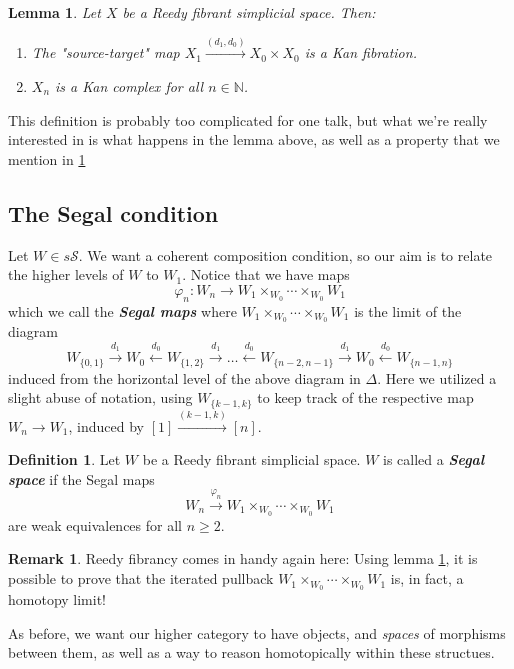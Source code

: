 \documentclass{article}
\newcommand{\textbi}[1]{\textbf{\textit{#1}}}
\newcommand{\bN}{\mathbb{N}}
\newcommand{\cS}{\mathcal{S}}
\newcommand{\sS}{s\cS}
\newtheorem{lem}[subsection]{Lemma}
\theoremstyle{definition}
\newtheorem{defin}[subsection]{Definition}
\newtheorem{rem}[subsection]{Remark}
\begin{document}
\begin{lem}\label{refib}
    Let $X$ be a Reedy fibrant simplicial space. Then:
    \begin{enumerate}
        \item The "source-target" map $X_1\xrightarrow{(d_1,d_0)}X_0\times X_0$ is a Kan fibration.
        \item $X_n$ is a Kan complex for all $n\in \bN$.
    \end{enumerate}
\end{lem}

This definition is probably too complicated for one talk, but what we're really interested in is what happens in the lemma above, as well as a property that we mention in \ref{reedy}

\subsection*{The Segal condition}

Let $W\in\sS$. We want a coherent composition condition, so our aim is to relate the higher levels of $W$ to $W_1$. 
Notice that we have maps
$$\varphi_n : W_n\to W_1\times_{W_0}\cdots\times_{W_0}W_1$$ which we call the \textbi{Segal maps}
where $W_1\times_{W_0}\cdots\times_{W_0}W_1$ is the limit of the diagram
$$W_{\{0,1\}}\xrightarrow{d_1}W_0\xleftarrow{d_0}W_{\{1,2\}}\xrightarrow{d_1}\dots \xleftarrow{d_0}W_{\{n-2,n-1\}}\xrightarrow{d_1}W_0\xleftarrow{d_0}W_{\{n-1,n\}}$$
induced from the horizontal level of the above diagram in $\Delta$.
Here we utilized a slight abuse of notation, using $W_{\{k-1,k\}}$ to keep track of the respective map $W_n\to W_1$, induced by $[1]\xrightarrow{(k-1,k)}[n]$.

\begin{defin}
    Let $W$ be a Reedy fibrant simplicial space. $W$ is called a \textbi{Segal space} if the Segal maps 
    $$W_n\xrightarrow{\varphi_n} W_1\times_{W_0}\cdots\times_{W_0}W_1$$ are weak equivalences for all $n\geq 2$.
\end{defin}

\begin{rem}\label{reedy}
    Reedy fibrancy comes in handy again here: Using lemma \ref{refib}, it is possible to prove that the iterated pullback $W_1\times_{W_0}\cdots\times_{W_0}W_1$ is, in fact, a homotopy limit! 
\end{rem}

As before, we want our higher category to have objects, and \textit{spaces} of morphisms between them, as well as a way to reason homotopically within these structues.
\end{document}
